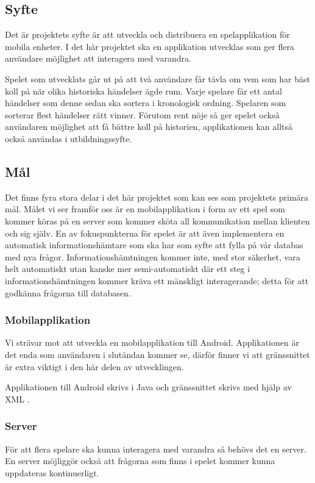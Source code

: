 \documentclass[12pt,a4paper]{article}
\begin{document}
\subsection{Syfte}
Det är projektets syfte är att utveckla och distribuera en spelapplikation för mobila enheter. I det här projektet ska en applikation utvecklas som ger flera användare möjlighet att interagera med varandra.

Spelet som utvecklats går ut på att två användare får tävla om vem som har bäst koll på när olika historiska händelser ägde rum. Varje spelare får ett antal händelser som denne sedan ska sortera i kronologisk ordning. Spelaren som sorterar flest händelser rätt vinner. Förutom rent nöje så ger spelet också användaren möjlighet att få bättre koll på historien, applikationen kan alltså också användas i utbildningssyfte.

\subsection{Mål}
Det finns fyra stora delar i det här projektet som kan ses som projektets primära mål. Målet vi ser framför oss är en mobilapplikation i form av ett spel som kommer köras på en server som kommer sköta all kommunikation mellan klienten och sig själv. En av fokuspunkterna för spelet är att även implementera en automatisk informationshämtare som ska har som syfte att fylla på vår databas med nya frågor. Informationshämtningen kommer inte, med stor säkerhet, vara helt automatiskt utan kanske mer semi-automatiskt där ett steg i informationshämtningen kommer kräva ett mänskligt interagerande; detta för att godkänna frågorna till databasen. 


\subsubsection{Mobilapplikation}
Vi strävar mot att utveckla en mobilapplikation till Android. Applikationen är det enda som användaren i slutändan kommer se, därför finner vi att gränssnittet är extra viktigt i den här delen av utvecklingen. 

Applikationen till Android skrivs i Java och gränssnittet skrivs med hjälp av XML \cite{xml}. 

\subsubsection{Server}
För att flera spelare ska kunna interagera med varandra så behövs det en server. En server möjliggör också att frågorna som finns i spelet kommer kunna uppdateras kontinuerligt.
\end{document}
